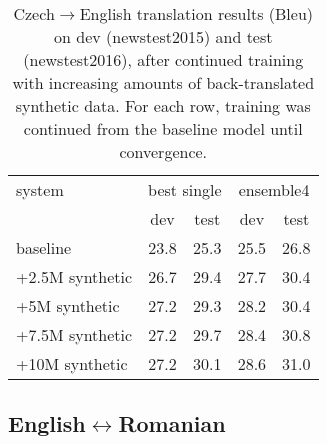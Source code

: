 \documentclass[11pt]{article}
\begin{document}
\begin{table}
\centering
\begin{tabular}{l|cc|cc}
system & \multicolumn{2}{c|}{best single} & \multicolumn{2}{c}{ensemble4}\\
& dev & test & dev & test\\
\hline
baseline & 23.8 & 25.3 &   %
25.5 & 26.8 \\  %
+2.5M synthetic & 26.7 & 29.4 &  %
27.7 & 30.4 \\ %
+5M synthetic & 27.2 & 29.3 &  %
28.2 & 30.4 \\ %
+7.5M synthetic & 27.2 & 29.7 &  %
28.4  & 30.8 \\ %
+10M synthetic & 27.2 & 30.1 &  %
28.6 & 31.0 \\ %
\end{tabular}
\caption{Czech$\rightarrow$English translation results ({\sc Bleu}) on dev (newstest2015) and test (newstest2016), after continued training with increasing amounts of 
back-translated synthetic data. For each row, training was continued from the baseline model until convergence.}
\label{increase-bt}
\end{table}

\subsection{English$\leftrightarrow$Romanian}
\end{document}
